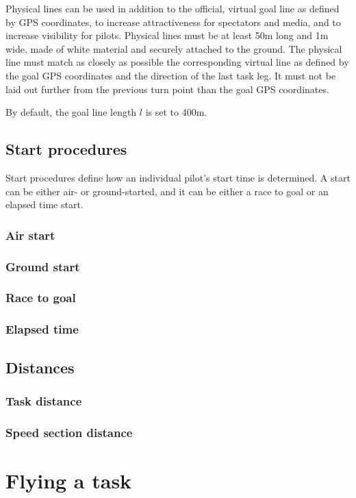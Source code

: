 \documentclass{article}
\begin{document}
Physical lines can be used in addition to the official, virtual goal line as
defined by GPS coordinates, to increase attractiveness for spectators and
media, and to increase visibility for pilots. Physical lines must be at least
50m long and 1m wide, made of white material and securely attached to the
ground. The physical line must match as closely as possible the corresponding
virtual line as defined by the goal GPS coordinates and the direction of the
last task leg. It must not be laid out further from the previous turn point
than the goal GPS coordinates.

By default, the goal line length \(l\) is set to 400m.

\subsection{Start procedures}
Start procedures define how an individual pilot’s start time is determined.
A start can be either air- or ground-started, and it can be either a race to
goal or an elapsed time start.

\subsubsection{Air start}
\subsubsection{Ground start}
\subsubsection{Race to goal}
\subsubsection{Elapsed time}
\subsection{Distances}
\subsubsection{Task distance}
\label{sec:task-distance}
\subsubsection{Speed section distance}

\newpage
\section{Flying a task}
\end{document}

